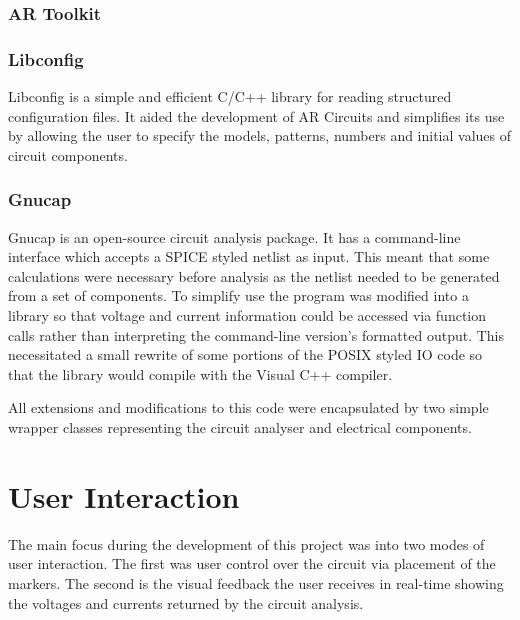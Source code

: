 \subsubsection{AR Toolkit}


\subsubsection{Libconfig}
Libconfig is a simple and efficient C/C++ library for reading structured
configuration files. It aided the development of AR Circuits and simplifies its
use by allowing the user to specify the models, patterns, numbers and initial
values of circuit components.

\subsubsection{Gnucap}
Gnucap is an open-source circuit analysis package. It has a command-line
interface which accepts a SPICE styled netlist as input. This meant that some
calculations were necessary before analysis as the netlist needed to be generated
from a set of components. To simplify use the program was modified into a
library so that voltage and current information could be accessed via function
calls rather than interpreting the command-line version's formatted output. This
necessitated a small rewrite of some portions of the POSIX styled IO code so
that the library would compile with the Visual C++ compiler.

All extensions and modifications to this code were encapsulated by two simple
wrapper classes representing the circuit analyser and electrical components.

\section{User Interaction}
The main focus during the development of this project was into two modes of user
interaction. The first was user control over the circuit via placement of the
markers. The second is the visual feedback the user receives in real-time
showing the voltages and currents returned by the circuit analysis.


